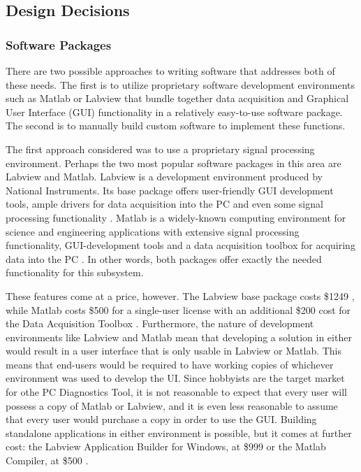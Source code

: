 \subsection[Design Decisions]{Design Decisions}
\subsubsection[Software Packages]{Software Packages}
There are two possible approaches to writing software that addresses both of 
these needs. The first is to utilize proprietary software development 
environments such as Matlab or Labview that bundle together data acquisition 
and Graphical User Interface (GUI) functionality in a relatively easy-to-use 
software package. The second is to manually build custom software to implement 
these functions.

The first approach considered was to use a proprietary signal processing 
environment. Perhaps the two most popular software packages in this area are 
Labview and Matlab. Labview is a development environment produced by National 
Instruments. Its base package offers user-friendly GUI development tools, ample 
drivers for data acquisition into the PC and even some signal processing 
functionality \cite{web:labviewbase}. Matlab is a widely-known computing 
environment for science and engineering applications with extensive signal 
processing functionality, GUI-development tools and a data acquisition toolbox 
for acquiring data into the PC \cite{web:matlab}. In other words, both packages 
offer exactly the needed functionality for this subsystem.

These features come at a price, however. The Labview base package costs 
\$1249 \cite{web:labviewbase}, while Matlab costs \$500 for a single-user license with an 
additional \$200 cost for the Data Acquisition Toolbox \cite{web:matlab}\cite{web:matlabdaq}. 
Furthermore, the nature of development environments like Labview and Matlab mean that 
developing a solution in either would result in a user interface that is only usable in 
Labview or Matlab. This means that end-users would be required to have working 
copies of whichever environment was used to develop the UI. Since hobbyists are 
the target market for othe PC Diagnostics Tool, it is not reasonable to expect 
that every user will possess a copy of Matlab or Labview, and it is even less 
reasonable to assume that every user would purchase a copy in order to use the 
GUI. Building standalone applications in either environment is possible, but it 
comes at further cost: the Labview Application Builder for Windows, at \$999 \cite{web:labviewbase} 
or the Matlab Compiler, at \$500 \cite{web:matlabcompiler}. 

